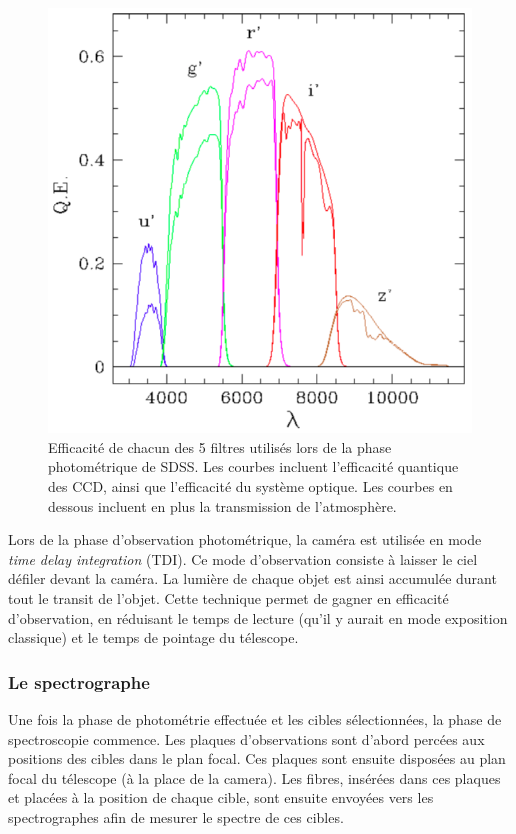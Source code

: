 \begin{figure}
  \centering
  \includegraphics[scale=0.4]{Filtres}
  \caption{Efficacité de chacun des 5 filtres utilisés lors de la phase photométrique de SDSS. Les courbes incluent l'efficacité quantique des CCD, ainsi que l'efficacité du système optique. Les courbes en dessous incluent en plus la transmission de l'atmosphère.}
  \label{fig:Filtres}
\end{figure}

Lors de la phase d'observation photométrique, la caméra est utilisée en mode \emph{time delay integration} (TDI). Ce mode d'observation consiste à laisser le ciel défiler devant la caméra. La lumière de chaque objet est ainsi accumulée durant tout le transit de l'objet. Cette technique permet de gagner en efficacité d'observation, en réduisant le temps de lecture (qu'il y aurait en mode exposition classique) et le temps de pointage du télescope.


\subsubsection{Le spectrographe}

Une fois la phase de photométrie effectuée et les cibles sélectionnées, la phase de spectroscopie commence.
Les plaques d'observations sont d'abord percées aux positions des cibles dans le plan focal.
Ces plaques sont ensuite disposées au plan focal du télescope (à la place de la camera). Les fibres, insérées dans ces plaques et placées à la position de chaque cible, sont ensuite envoyées vers les spectrographes \autocite{Smee2012} afin de mesurer le spectre de ces cibles.

